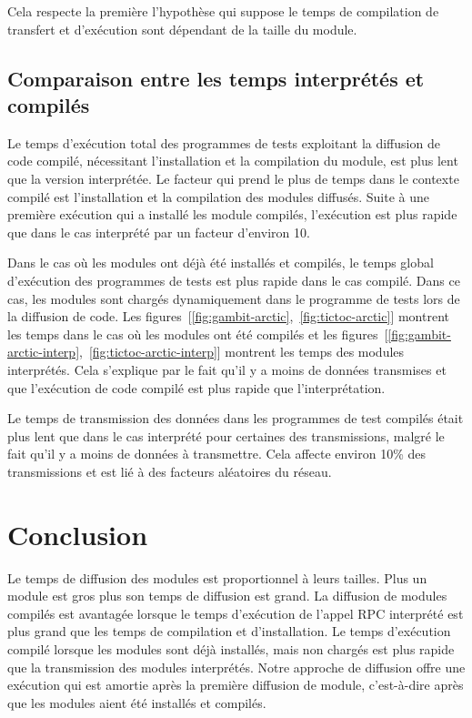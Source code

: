 Cela respecte la première l'hypothèse qui suppose le temps de compilation de
transfert et d'exécution sont dépendant de la taille du module.

\subsection{Comparaison entre les temps interprétés et compilés}


Le temps d'exécution total des programmes de tests exploitant la diffusion de
code compilé, nécessitant l'installation et la compilation du module, est plus
lent que la version interprétée. Le facteur qui prend le plus de temps dans le
contexte compilé est l'installation et la compilation des modules diffusés.
Suite à une première exécution qui a installé les module compilés, l'exécution
est plus rapide que dans le cas interprété par un facteur d'environ 10.

Dans le cas où les modules ont déjà été installés et compilés, le temps global
d'exécution des programmes de tests est plus rapide dans le cas compilé.  Dans ce cas,
les modules sont chargés dynamiquement dans le programme de tests lors de la
diffusion de code.  Les
figures~[\ref{fig:gambit-arctic},~\ref{fig:tictoc-arctic}] montrent les temps
dans le cas où les modules ont été compilés et les
figures~[\ref{fig:gambit-arctic-interp},~\ref{fig:tictoc-arctic-interp}] montrent
les temps des modules interprétés. Cela s'explique par le fait qu'il y a moins
de données transmises et que l'exécution de code compilé est plus rapide que
l'interprétation.

Le temps de transmission des données dans les programmes de test compilés était
plus lent que dans le cas interprété pour certaines des transmissions, malgré
le fait qu'il y a moins de données à transmettre. Cela affecte environ 10\% des
transmissions et est lié à des facteurs aléatoires du réseau.

\section {Conclusion}

Le temps de diffusion des modules est proportionnel à leurs tailles.  Plus un
module est gros plus son temps de diffusion est grand.  La diffusion de modules
compilés est avantagée lorsque le temps d'exécution de l'appel RPC interprété
est plus grand que les temps de compilation et d'installation. Le temps
d'exécution compilé lorsque les modules sont déjà installés, mais non chargés
est plus rapide que la transmission des modules interprétés.  Notre approche de
diffusion offre une exécution qui est amortie après la première diffusion de module,
c'est-à-dire après que les modules aient été installés et compilés.



